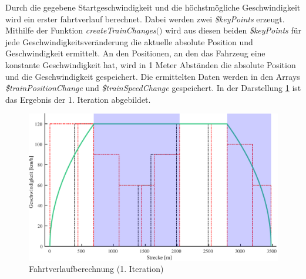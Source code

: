 Durch die gegebene Startgeschwindigkeit und die höchstmögliche Geschwindigkeit wird ein erster \Gls{fahrtverlauf} berechnet. Dabei werden zwei \textit{\$keyPoints} erzeugt. Mithilfe der Funktion \textit{createTrainChanges$($$)$} wird aus diesen beiden \textit{\$keyPoints} für jede Geschwindigkeitsveränderung die aktuelle absolute Position und Geschwindigkeit ermittelt. An den Positionen, an den das Fahrzeug eine konstante Geschwindigkeit hat, wird in 1 Meter Abständen die absolute Position und die Geschwindigkeit gespeichert. Die ermittelten Daten werden in den Arrays \textit{\$trainPositionChange} und \textit{\$trainSpeedChange} gespeichert. In der Darstellung \ref{fig:it3} ist das Ergebnis der 1. Iteration abgebildet.
\begin{figure}
\includegraphics[width=\linewidth]{../images/matlab/it3.pdf}
\caption{Fahrtverlaufberechnung (1. Iteration)}
\label{fig:it3}
\end{figure}
